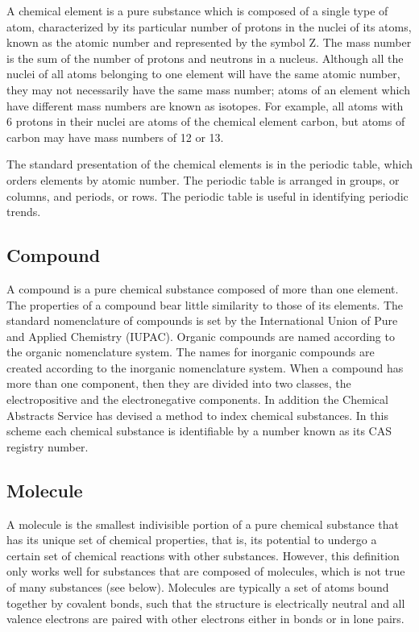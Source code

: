 \documentclass[
]{book}
\begin{document}
A chemical element is a pure substance which is composed of a single type of atom, characterized by its particular number of protons in the nuclei of its atoms, known as the atomic number and represented by the symbol Z. The mass number is the sum of the number of protons and neutrons in a nucleus. Although all the nuclei of all atoms belonging to one element will have the same atomic number, they may not necessarily have the same mass number; atoms of an element which have different mass numbers are known as isotopes. For example, all atoms with 6 protons in their nuclei are atoms of the chemical element carbon, but atoms of carbon may have mass numbers of 12 or 13.

The standard presentation of the chemical elements is in the periodic table, which orders elements by atomic number. The periodic table is arranged in groups, or columns, and periods, or rows. The periodic table is useful in identifying periodic trends.

\hypertarget{compound}{%
\subsection{Compound}\label{compound}}

A compound is a pure chemical substance composed of more than one element. The properties of a compound bear little similarity to those of its elements. The standard nomenclature of compounds is set by the International Union of Pure and Applied Chemistry (IUPAC). Organic compounds are named according to the organic nomenclature system. The names for inorganic compounds are created according to the inorganic nomenclature system. When a compound has more than one component, then they are divided into two classes, the electropositive and the electronegative components. In addition the Chemical Abstracts Service has devised a method to index chemical substances. In this scheme each chemical substance is identifiable by a number known as its CAS registry number.

\hypertarget{molecule}{%
\subsection{Molecule}\label{molecule}}

A molecule is the smallest indivisible portion of a pure chemical substance that has its unique set of chemical properties, that is, its potential to undergo a certain set of chemical reactions with other substances. However, this definition only works well for substances that are composed of molecules, which is not true of many substances (see below). Molecules are typically a set of atoms bound together by covalent bonds, such that the structure is electrically neutral and all valence electrons are paired with other electrons either in bonds or in lone pairs.
\end{document}
